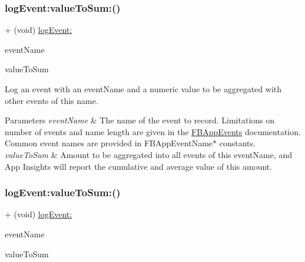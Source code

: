 \subsubsection{\texorpdfstring{log\+Event\+:value\+To\+Sum\+:()}{logEvent:valueToSum:()}\hspace{0.1cm}{\footnotesize\ttfamily [2/5]}}
{\footnotesize\ttfamily + (void) \hyperlink{interfaceFBAppEvents_a816373dd50bcf7381bf8194758ef8441}{log\+Event\+:} \begin{DoxyParamCaption}\item[{(N\+S\+String $\ast$)}]{event\+Name }\item[{valueToSum:(double)}]{value\+To\+Sum }\end{DoxyParamCaption}}

Log an event with an event\+Name and a numeric value to be aggregated with other events of this name.


\begin{DoxyParams}{Parameters}
{\em event\+Name} & The name of the event to record. Limitations on number of events and name length are given in the {\ttfamily \hyperlink{interfaceFBAppEvents}{F\+B\+App\+Events}} documentation. Common event names are provided in {\ttfamily F\+B\+App\+Event\+Name$\ast$} constants.\\
\hline
{\em value\+To\+Sum} & Amount to be aggregated into all events of this event\+Name, and App Insights will report the cumulative and average value of this amount. \\
\hline
\end{DoxyParams}
\mbox{\label{interfaceFBAppEvents_a9ac18622973fab340ecf25c63c933a34}} 
\subsubsection{\texorpdfstring{log\+Event\+:value\+To\+Sum\+:()}{logEvent:valueToSum:()}\hspace{0.1cm}{\footnotesize\ttfamily [3/5]}}
{\footnotesize\ttfamily + (void) \hyperlink{interfaceFBAppEvents_a816373dd50bcf7381bf8194758ef8441}{log\+Event\+:} \begin{DoxyParamCaption}\item[{(N\+S\+String $\ast$)}]{event\+Name }\item[{valueToSum:(double)}]{value\+To\+Sum }\end{DoxyParamCaption}}

